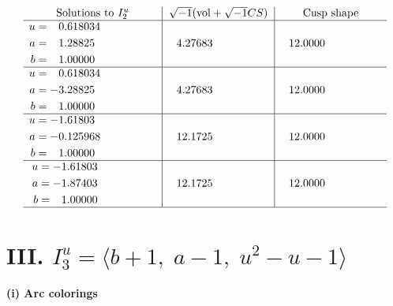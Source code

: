 \documentclass[1p]{elsarticle_modified}
\theoremstyle{definition}
\newcommand{\I}{\sqrt{-1}}
\begin{document}
$$\begin{array}{c|c|c}  
\text{Solutions to }I^u_{2}& \I (\text{vol} + \sqrt{-1}CS) & \text{Cusp shape}\\
 \hline 
\begin{aligned}
u &= \phantom{-}0.618034\phantom{ +0.000000I} \\
a &= \phantom{-}1.28825\phantom{ +0.000000I} \\
b &= \phantom{-}1.00000\phantom{ +0.000000I}\end{aligned}
 & \phantom{-}4.27683\phantom{ +0.000000I} & \phantom{-}12.0000\phantom{ +0.000000I} \\ \hline\begin{aligned}
u &= \phantom{-}0.618034\phantom{ +0.000000I} \\
a &= -3.28825\phantom{ +0.000000I} \\
b &= \phantom{-}1.00000\phantom{ +0.000000I}\end{aligned}
 & \phantom{-}4.27683\phantom{ +0.000000I} & \phantom{-}12.0000\phantom{ +0.000000I} \\ \hline\begin{aligned}
u &= -1.61803\phantom{ +0.000000I} \\
a &= -0.125968\phantom{ +0.000000I} \\
b &= \phantom{-}1.00000\phantom{ +0.000000I}\end{aligned}
 & \phantom{-}12.1725\phantom{ +0.000000I} & \phantom{-}12.0000\phantom{ +0.000000I} \\ \hline\begin{aligned}
u &= -1.61803\phantom{ +0.000000I} \\
a &= -1.87403\phantom{ +0.000000I} \\
b &= \phantom{-}1.00000\phantom{ +0.000000I}\end{aligned}
 & \phantom{-}12.1725\phantom{ +0.000000I} & \phantom{-}12.0000\phantom{ +0.000000I}\\
 \hline 
 \end{array}$$\newpage\newpage\renewcommand{\arraystretch}{1}
\centering \section*{III. $I^u_{3}= \langle b+1,\;a-1,\;u^2- u-1 \rangle$}
\flushleft \textbf{(i) Arc colorings}\\
\end{document}
